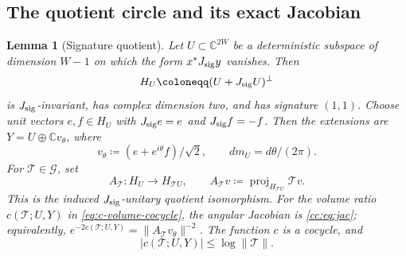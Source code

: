 \documentclass[11pt]{article}
\numberwithin{equation}{section}
\newtheorem{lemma}[theorem]{Lemma}
\theoremstyle{remark}
\newcommand{\C}{\mathbb C}
\begin{document}
\subsection{The quotient circle and its exact Jacobian}

\begin{lemma}[Signature quotient]\label{cc:lem:quotient}
Let $U\subset\C^{2W}$ be a deterministic
subspace of dimension $W-1$ on which the form
$x^*J_{\rm sig}y$ vanishes. Then
\[
 H_U\coloneqq (U+J_{\rm sig}U)^\perp
\]
is \(J_{\rm sig}\)-invariant, has complex dimension two, and has signature \((1,1)\).
Choose unit vectors \(e,f\in H_U\) with \(J_{\rm sig}e=e\) and \(J_{\rm sig}f=-f\). Then
the extensions are \(Y=U\oplus\mathbb C v_\theta\), where
\begin{equation}
 v_\theta\coloneqq (e+e^{i\theta}f)/\sqrt2,\qquad
 dm_U=d\theta/(2\pi).
 \label{cc:eq:circle}
\end{equation}
For \(\mathcal T\in\mathcal G\), set
\[
 A_{\mathcal T}:H_U\longrightarrow H_{\mathcal T U},\qquad
 A_{\mathcal T}v\coloneqq \operatorname{proj}_{H_{\mathcal T U}}\mathcal T v .
\]
This is the induced \(J_{\rm sig}\)-unitary quotient isomorphism. For the volume
ratio $c(\mathcal T;U,Y)$ in \eqref{eq:c-volume-cocycle}, the angular Jacobian
is \eqref{cc:eq:jac}; equivalently,
$e^{-2c(\mathcal T;U,Y)}=\|A_{\mathcal T}v_\theta\|^{-2}$.
The function \(c\) is a cocycle, and
\begin{equation}
 |c(\mathcal T;U,Y)|\le\log\|\mathcal T\|.
 \label{cc:eq:boundc}
\end{equation}
\end{lemma}
\end{document}
